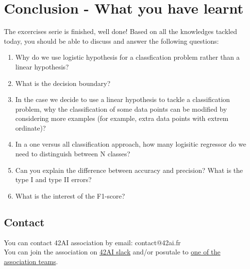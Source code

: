 \documentclass{42-en}
\begin{document}

\newpage

\chapter{Conclusion - What you have learnt}

The excercises serie is finished, well done!
Based on all the knowledges tackled today, you should be able to discuss and answer the following questions:

\begin{enumerate}
  \item Why do we use logistic hypothesis for a classfication problem rather than a linear hypothesis?
  \item What is the decision boundary?
  \item In the case we decide to use a linear hypothesis to tackle a classification problem, why the classification of some data points can be modified by considering more examples (for example, extra data points with extrem ordinate)?
  \item In a one versus all classification approach, how many logisitic regressor do we need to distinguish between N classes?
  \item Can you explain the difference between accuracy and precision? What is the type I and type II errors?
  \item What is the interest of the F1-score?
\end{enumerate}


\newpage

\section*{Contact}
You can contact 42AI association by email: contact@42ai.fr\\
You can join the association on \href{https://join.slack.com/t/42-ai/shared_invite/zt-ebccw5r7-YPkDM6xOiYRPjqJXkrKgcA}{42AI slack}
and/or posutale to \href{https://forms.gle/VAFuREWaLmaqZw2D8}{one of the association teams}.
\end{document}
